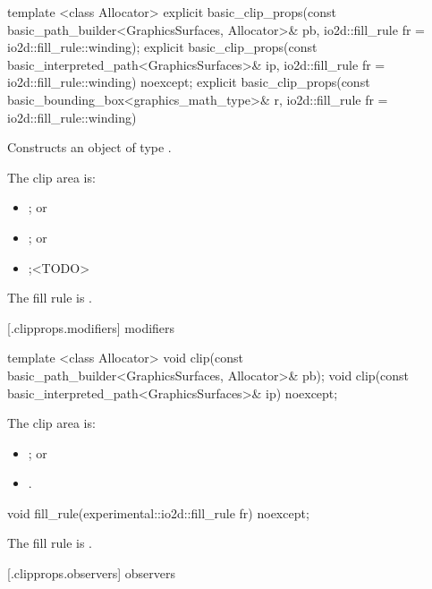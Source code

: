 %
\begin{itemdecl}
template <class Allocator>
explicit basic_clip_props(const basic_path_builder<GraphicsSurfaces, Allocator>& pb,
  io2d::fill_rule fr = io2d::fill_rule::winding);
explicit basic_clip_props(const basic_interpreted_path<GraphicsSurfaces>& ip,
  io2d::fill_rule fr = io2d::fill_rule::winding) noexcept;
explicit basic_clip_props(const basic_bounding_box<graphics_math_type>& r,
  io2d::fill_rule fr = io2d::fill_rule::winding)
\end{itemdecl}
\begin{itemdescr}
\pnum
\effects
Constructs an object of type .

\pnum
The clip area is:
\begin{itemize}
\item {}; or
\item {}; or
\item {};<TODO>
\end{itemize}

\pnum
The fill rule is .
\end{itemdescr}

 [\iotwod.clipprops.modifiers] { modifiers}

%
\begin{itemdecl}
template <class Allocator>
void clip(const basic_path_builder<GraphicsSurfaces, Allocator>& pb);
void clip(const basic_interpreted_path<GraphicsSurfaces>& ip) noexcept;
\end{itemdecl}
\begin{itemdescr}
\pnum
\effects
The clip area is:
\begin{itemize}
\item {}; or
\item {}.
\end{itemize}
\end{itemdescr}

%
\begin{itemdecl}
void fill_rule(experimental::io2d::fill_rule fr) noexcept;
\end{itemdecl}
\begin{itemdescr}
\pnum
\effects
The fill rule is .
\end{itemdescr}

 [\iotwod.clipprops.observers] { observers}

